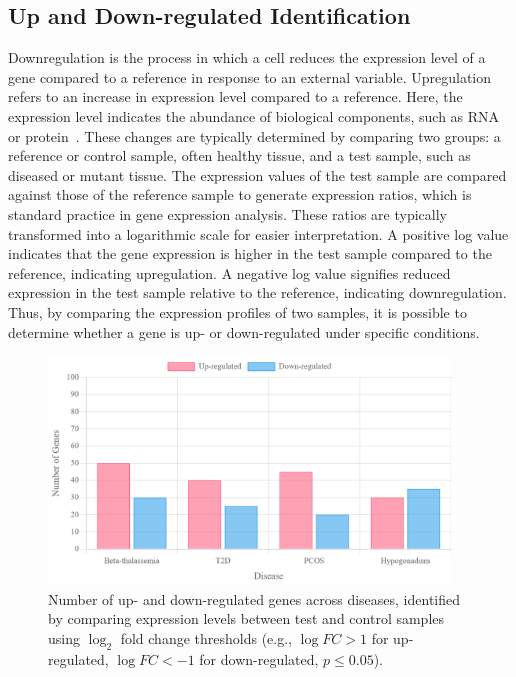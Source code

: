 \subsection{Up and Down-regulated Identification}
\label{sec:sec3_4_6}

Downregulation is the process in which a cell reduces the expression level of a gene compared to a reference in response to an external variable. Upregulation refers to an increase in expression level compared to a reference. Here, the expression level indicates the abundance of biological components, such as RNA or protein~\cite{updown_reg_ref}. These changes are typically determined by comparing two groups: a reference or control sample, often healthy tissue, and a test sample, such as diseased or mutant tissue. The expression values of the test sample are compared against those of the reference sample to generate expression ratios, which is standard practice in gene expression analysis. These ratios are typically transformed into a logarithmic scale for easier interpretation. A positive log value indicates that the gene expression is higher in the test sample compared to the reference, indicating upregulation. A negative log value signifies reduced expression in the test sample relative to the reference, indicating downregulation. Thus, by comparing the expression profiles of two samples, it is possible to determine whether a gene is up- or down-regulated under specific conditions.

\begin{figure}[h]
\centering
\includegraphics[width=0.95\textwidth]{./fig/disease}
\caption{Number of up- and down-regulated genes across diseases, identified by comparing expression levels between test and control samples using $\log_2$ fold change thresholds (e.g., $\log FC > 1$ for up-regulated, $\log FC < -1$ for down-regulated, $p \leq 0.05$).}
\label{fig:up_down_genes}
\end{figure}

